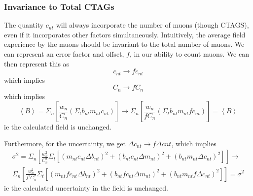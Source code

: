 \documentclass[twoside]{article}
\begin{document}
\subsubsection{Invariance  to Total CTAGs}
The quantity $c_{nt}$ will always incorporate the number of muons (though CTAGS), even if it incorporates other factors simultaneously. Intuitively, the average field experience by the muons should be invariant to the total number of muons. We can represent an error factor and offset, $f$, in our ability to count muons. We can then represent this as
\begin{equation}
c_{nt} \to fc_{nt}
\end{equation}
which implies 
\begin{equation}
C_{n} \to fC_{n}
\end{equation}
which implies
\begin{equation}
	\left\langle B \right\rangle =
	\Sigma_{n}[ \frac{w_n}{C_n} (\Sigma_{t} b_{nt} m_{nt} c_{nt})] \to
	\Sigma_{n}[ \frac{w_n}{f C_n} (\Sigma_{t} b_{nt} m_{nt} f c_{nt})] = 
	\left\langle B \right\rangle
\end{equation}
ie the calculated field is unchanged.


Furthermore, for the uncertainty, we get $\Delta c_{nt} \to f\Delta c{nt}$, which implies
\begin{equation}
\begin{split}
	\sigma^2 = \Sigma_n [\frac{w^2_n}{C^2_n} \Sigma_t  [(m_{nt} c_{nt} \Delta b_{nt})^2 + (b_{nt} c_{nt} \Delta m_{nt})^2  + (b_{nt} m_{nt} \Delta c_{nt})^2 ]] \to \\ 
	\Sigma_n [\frac{w^2_n}{f^2 C^2_n} \Sigma_t  [(m_{nt} f c_{nt} \Delta b_{nt})^2 + (b_{nt} f c_{nt} \Delta m_{nt})^2  + (b_{nt} m_{nt} f \Delta c_{nt})^2 ]] = 
	\sigma^2 
\end{split}
\end{equation}
ie the calculated uncertainty in the field is unchanged.
\end{document}
